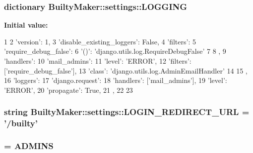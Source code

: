 \hypertarget{namespaceBuiltyMaker_1_1settings_a2d482d37b32220d29a212c783d38e563}{
\subsubsection[{\-L\-O\-G\-G\-I\-N\-G}]{\setlength{\rightskip}{0pt plus 5cm}dictionary {\bf \-Builty\-Maker\-::settings\-::\-L\-O\-G\-G\-I\-N\-G}}}\label{namespaceBuiltyMaker_1_1settings_a2d482d37b32220d29a212c783d38e563}
{\bfseries \-Initial value\-:}
\begin{DoxyCode}
1 {
2     'version': 1,
3     'disable_existing_loggers': False,
4     'filters': {
5         'require_debug_false': {
6             '()': 'django.utils.log.RequireDebugFalse'
7         }
8     },
9     'handlers': {
10         'mail_admins': {
11             'level': 'ERROR',
12             'filters': ['require_debug_false'],
13             'class': 'django.utils.log.AdminEmailHandler'
14         }
15     },
16     'loggers': {
17         'django.request': {
18             'handlers': ['mail_admins'],
19             'level': 'ERROR',
20             'propagate': True,
21         },
22     }
23 }
\end{DoxyCode}
\hypertarget{namespaceBuiltyMaker_1_1settings_a3053c7b1230d65c2bb3455164ac28000}{
\subsubsection[{\-L\-O\-G\-I\-N\-\_\-\-R\-E\-D\-I\-R\-E\-C\-T\-\_\-\-U\-R\-L}]{\setlength{\rightskip}{0pt plus 5cm}string {\bf \-Builty\-Maker\-::settings\-::\-L\-O\-G\-I\-N\-\_\-\-R\-E\-D\-I\-R\-E\-C\-T\-\_\-\-U\-R\-L} = '/builty'}}\label{namespaceBuiltyMaker_1_1settings_a3053c7b1230d65c2bb3455164ac28000}
\hypertarget{namespaceBuiltyMaker_1_1settings_afea6bd5b4b25614d24c57cb213ca7508}{
\subsubsection[{\-M\-A\-N\-A\-G\-E\-R\-S}]{ = {\bf \-A\-D\-M\-I\-N\-S}}}\label{namespaceBuiltyMaker_1_1settings_afea6bd5b4b25614d24c57cb213ca7508}
